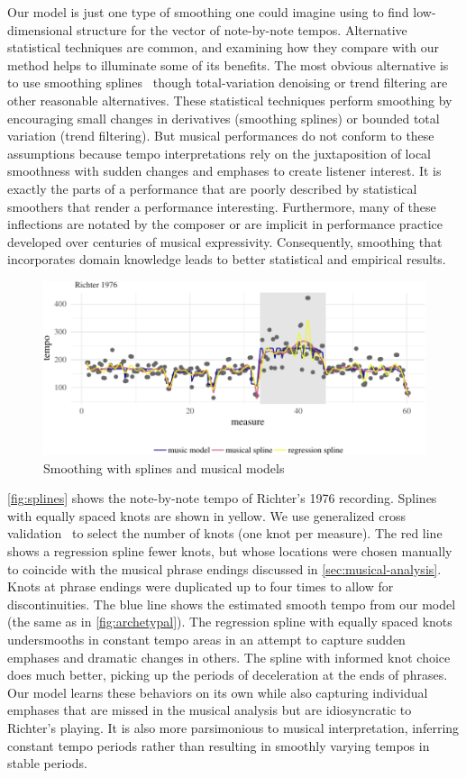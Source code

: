 \documentclass[aoas]{imsart}
\begin{document}
Our model is just one type of smoothing one could imagine using to
find low-dimensional structure for the vector of note-by-note
tempos. Alternative statistical techniques are common, and examining
how they compare with our method helps to illuminate some of its
benefits. The most obvious alternative is to use smoothing
splines~\citep{CravenWahba1978,Wahba1990} though total-variation
denoising or trend filtering \citep{KimKoh2009,Tibshirani2014} are
other reasonable alternatives.
These statistical techniques perform smoothing by encouraging small
changes in derivatives (smoothing splines) or bounded total variation
(trend filtering). 
But musical performances do not conform to these assumptions because tempo interpretations rely on the juxtaposition of local smoothness
with sudden changes and emphases to create listener interest. It is
exactly the parts of a performance that are poorly described by
statistical smoothers that render a performance
interesting. Furthermore, many of these
inflections are notated by the 
composer or are implicit in performance practice developed over
centuries of musical expressivity. Consequently, smoothing that
incorporates domain knowledge leads to better statistical and
empirical results.
\begin{figure}[t]
  \centering
  \includegraphics[width=.9\linewidth]{alternative-smoothers-1}
  \caption{Smoothing with splines and musical models}
  \label{fig:splines}
\end{figure}

\autoref{fig:splines}
shows the note-by-note tempo of Richter's 1976 recording. Splines with
equally spaced knots are shown in yellow. We use generalized cross
validation~\citep{GolubHeath1979} to select the number of knots (one
knot per measure). The red line shows a regression spline fewer knots,
but whose locations were chosen
manually
to coincide with the musical phrase endings discussed in
\autoref{sec:musical-analysis}. Knots at phrase endings were
duplicated up to four times to allow for discontinuities. The blue line 
shows the estimated smooth tempo from our model (the same as in
\autoref{fig:archetypal}). The regression spline with
equally spaced knots undersmooths in constant tempo areas in an
attempt to capture sudden emphases and dramatic changes in others. The spline
with informed knot choice does much better, picking up the periods of
deceleration at the ends of phrases. Our model learns these behaviors
on its own while also capturing individual emphases that are missed in
the musical analysis but are idiosyncratic to Richter's playing. It is
also more parsimonious to musical interpretation, inferring constant
tempo periods rather than resulting in smoothly varying tempos in
stable periods.%
\end{document}

